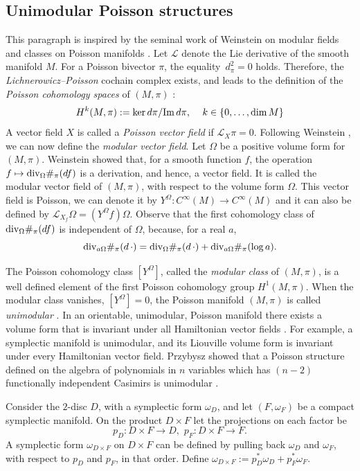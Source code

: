\documentclass{amsart}
\begin{document}
\subsection*{Unimodular Poisson structures}

This paragraph is inspired by the seminal work of Weinstein on modular fields and classes on Poisson manifolds \cite{Wmod}.
Let ${\mathcal L}$ denote the Lie derivative of the smooth manifold $M$. 
 For a Poisson bivector $\pi$, the equality $\,d_{\pi}^2=0$ holds. Therefore, the {\it Lichnerowicz--Poisson} cochain complex exists, and leads to the definition of the {\it Poisson cohomology spaces} of $(M,\pi)$ \cite{Lich}:
 \[
 H^{k}(M,\pi):=\ker d\pi / {\rm Im}\, d\pi, \quad \, k\in \{ 0, \ldots , \dim M \}
 \]
A vector field $X$ is called a {\it Poisson vector field} if ${\mathcal L}_{X}\pi = 0$. 
Following Weinstein \cite{Wmod}, we can now define the {\it modular vector field}. Let $\Omega$ be a positive volume form for $(M,\pi)$. 
Weinstein showed that, for a smooth function $f$, the operation $f\mapsto {\rm div}_{\Omega}\#_{\pi}(df)$ is a derivation, and hence, a vector field.
 It is called the modular vector field of $(M, \pi )$, with respect to the volume form $\Omega$. 
 This vector field is Poisson, we can denote it by $Y^{\Omega}: C^{\infty}(M)\to C^{\infty}(M)$ and it can also be defined by ${\mathcal L}_{X_f}\Omega = (Y^{\Omega}f)\Omega$. 
 Observe that the first cohomology class of ${\rm div}_{\Omega}\#_{\pi}(df)$ is independent of $\Omega$, because, for a real $a$, 
 \[
 {\rm div}_{a\Omega}\#_{\pi}(d\,\cdot) = {\rm div}_{\Omega}\#_{\pi}(d\,\cdot) + {\rm div}_{a\Omega}\#_{\pi}({\rm log} \,a).
 \]
 
The Poisson cohomology class $[Y^{\Omega}]$, called the {\it modular class} of $(M,\pi)$, is a well defined element of the first Poisson cohomology group $H^{1}(M,\pi)$. 
When the modular class vanishes, $[Y^{\Omega}]=0$, the Poisson manifold $(M,\pi)$ is called {\it unimodular} \cite{KS}. 
In an orientable, unimodular, Poisson manifold there exists a volume form that is invariant under all Hamiltonian vector fields \cite{Wmod}.
For example, a symplectic manifold is unimodular, and its Liouville volume form is invariant under every Hamiltonian vector field. 
Przybysz showed that a Poisson structure defined on the algebra of polynomials in $n$ variables which has $(n-2)$ functionally independent Casimirs is unimodular \cite{Przybysz}. 
%

Consider the $2$-disc $D$, with a symplectic form $\omega_{D}$, and let $(F, \omega_{F})$ be a compact symplectic manifold. 
On the product $D\times F$ let the projections on each factor be
$$p_{D}:D\times F\to D , \,\, p_{F}:D\times F\to F.$$
A symplectic form $\omega_{D\times F}$ on $D\times F$ can be defined by pulling back $\omega_{D}$ and $\omega_{F}$, with respect to $p_{D}$ and $p_{F}$, in that order. 
Define $\omega_{D\times F} := p_{D}^{\ast}\omega_{D}+p_{F}^{\ast}\omega_{F}$.
\end{document}
